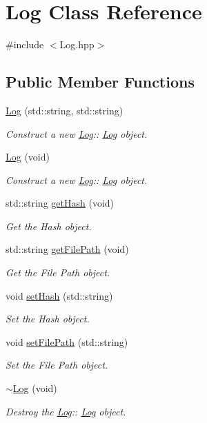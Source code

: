 \hypertarget{class_log}{}\section{Log Class Reference}
\label{class_log}


{\ttfamily \#include $<$Log.\+hpp$>$}

\subsection*{Public Member Functions}
\begin{DoxyCompactItemize}
\item 
\hyperlink{class_log_ae0979fb7a7f032fe453354c0bb204736}{Log} (std\+::string, std\+::string)
\begin{DoxyCompactList}\small\item\em Construct a new \hyperlink{class_log}{Log}\+:\+: \hyperlink{class_log}{Log} object. \end{DoxyCompactList}\item 
\hyperlink{class_log_a5c787984156efa09d466da5f2c832168}{Log} (void)
\begin{DoxyCompactList}\small\item\em Construct a new \hyperlink{class_log}{Log}\+:\+: \hyperlink{class_log}{Log} object. \end{DoxyCompactList}\item 
std\+::string \hyperlink{class_log_a9260683f85f7e9a2209cdaae19a1b582}{get\+Hash} (void)
\begin{DoxyCompactList}\small\item\em Get the Hash object. \end{DoxyCompactList}\item 
std\+::string \hyperlink{class_log_ad904745e682178df8405072499add3e2}{get\+File\+Path} (void)
\begin{DoxyCompactList}\small\item\em Get the File Path object. \end{DoxyCompactList}\item 
void \hyperlink{class_log_a15f1680044aef009232b513648a95901}{set\+Hash} (std\+::string)
\begin{DoxyCompactList}\small\item\em Set the Hash object. \end{DoxyCompactList}\item 
void \hyperlink{class_log_ab5f872112a7932749aa07c1ba649020a}{set\+File\+Path} (std\+::string)
\begin{DoxyCompactList}\small\item\em Set the File Path object. \end{DoxyCompactList}\item 
\hyperlink{class_log_ab047c1ac2053e451ff4b60c652e54353}{$\sim$\+Log} (void)
\begin{DoxyCompactList}\small\item\em Destroy the \hyperlink{class_log}{Log}\+:\+: \hyperlink{class_log}{Log} object. \end{DoxyCompactList}\end{DoxyCompactItemize}


